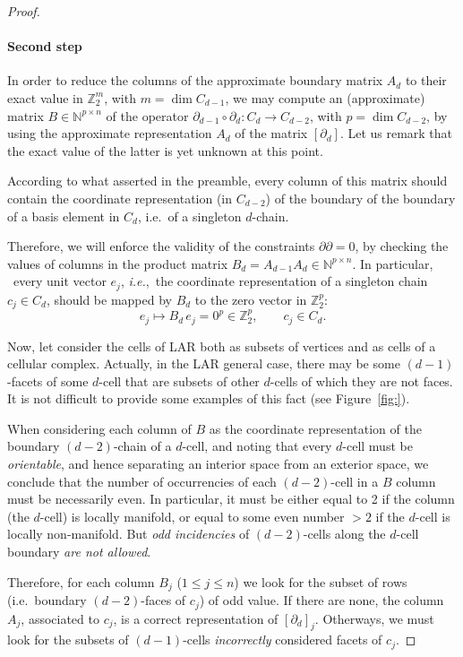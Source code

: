 \documentclass[11pt,oneside]{article}    %
\def\N{\mathbb{N}}
\def\Z{\mathbb{Z}}
\begin{document}
\begin{proof}
\paragraph{Second step} 
In order to reduce the columns of the approximate boundary matrix $A_d$ to their exact value in $\Z_2^m$, with $m=\dim C_{d-1}$, we may compute an (approximate) matrix $B\in\N^{p\times n}$ of the operator $\partial_{d-1}\circ\partial_d: C_d \to C_{d-2}$, with $p=\dim C_{d-2}$, by using the approximate representation $A_d$ of the matrix $[\partial_d]$. Let us remark that the exact value of the latter is yet unknown at this point.

According to what asserted in the preamble, every column of this matrix should contain the coordinate representation (in $C_{d-2}$) of the boundary of the boundary of a basis element in $C_d$, i.e.~of a singleton $d$-chain.

Therefore, we will enforce the validity of the constraints $\partial\partial=0$, by checking
the values of columns in the product matrix $B_d = A_{d-1} A_d \in \N^{p\times n}$. In particular, ~every unit vector $e_j$, \emph{i.e.},~the coordinate representation of a singleton chain $c_j\in C_d$, should be mapped by $B_d$ to the zero vector in $\Z_2^p$:
\begin{equation}
e_j \mapsto B_d\, e_j = 0^{p} \in \Z_2^p, \qquad c_j\in C_d.
\label{eq:boundaryofboundary}
\end{equation}

Now, let consider the cells of LAR both as subsets of vertices and as cells of a cellular complex.
Actually, in the LAR general case, there may be some $(d-1)$-facets of some $d$-cell that are subsets of other $d$-cells of which they are not faces. It is not difficult to provide some examples of this fact (see Figure~\ref{fig:}).

When considering each column of $B$ as the coordinate representation of the boundary $(d-2)$-chain of a $d$-cell, and noting that every $d$-cell must be \emph{orientable}, and hence separating an interior space from an exterior space, we conclude that the number of occurrencies of each $(d-2)$-cell in a $B$ column must be necessarily even. In particular, it must be either equal to 2 if the column (the $d$-cell) is locally manifold, or equal to some even number $>2$ if the $d$-cell is locally non-manifold. But \emph{odd incidencies} of $(d-2)$-cells along the $d$-cell boundary \emph{are not allowed}. 

Therefore, for each column $B_j$ ($1\leq j\leq n$) we look for the subset of rows (i.e.~boundary $(d-2)$-faces of $c_j$) of odd value. If there are none, the column $A_j$, associated to $c_j$, is a correct representation of $[\partial_d]_j$. Otherways, we must look for the subsets of $(d-1)$-cells \emph{incorrectly} considered facets of $c_j$.


\end{proof}
\end{document}
